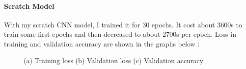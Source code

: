 \documentclass[runningheads]{llncs}
\begin{document}
\paragraph{\bf Scratch Model} 
With my scratch CNN model, I trained it for 30 epochs. It cost about 3600s to train some first epochs and then decreased to about 2700s per epoch. Loss in training and validation accuracy are shown in the graphs below :
\begin{figure}[H]
    \centering
    \caption{(a) Training loss (b) Validation loss (c) Validation accuracy}
    \label{fig:scratch}
\end{figure}
\end{document}
